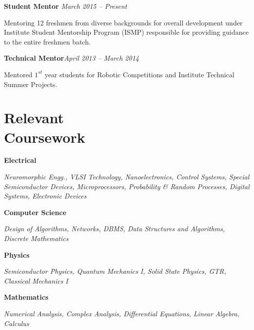 \documentclass[margin,line]{res}
\newenvironment{list1}{
  \begin{list}{\ding{113}}{%
      \setlength{\itemsep}{0in}
      \setlength{\parsep}{0in} \setlength{\parskip}{0in}
      \setlength{\topsep}{0in} \setlength{\partopsep}{0in} 
      \setlength{\leftmargin}{0.17in}}}{\end{list}}
\begin{document}
\begin{resume}
\vspace*{-0.1in}

\textbf{Student Mentor} \hfill \textit{March 2015 -- Present}\\
\vspace*{-.15in}
\begin{list1}
\item[]Mentoring 12 freshmen from diverse backgrounds for overall development under Institute Student Mentorship Program (ISMP) responsible for providing guidance to the entire freshmen batch. 
\end{list1}

\vspace*{-0.1in}

\textbf{Technical Mentor}\hfill \textit{April 2013 -- March 2014}\\
\vspace*{-.15in}
\begin{list1}
\item[]Mentored $1^{st}$ year students for Robotic Competitions and Institute Technical Summer Projects.
\end{list1}

\section{\sc Relevant \\Coursework} 
\begin{list1}
\item[\strut\hspace{0.5cm}\hypertarget{crselst}{\textbf{Electrical}}]
\item[]\textit{Neuromorphic Engg., VLSI Technology, Nanoelectronics, Control Systems, Special Semiconductor Devices, Microprocessors, Probability \& Random Processes, Digital Systems, Electronic Devices}
\item[\strut\hspace{0.5cm}\textbf{Computer Science}]
\vspace{0.05in}
\item[]\textit{Design of Algorithms, Networks, DBMS, Data Structures and Algorithms, Discrete Mathematics}
\item[\strut\hspace{0.5cm}\textbf{Physics}]
\vspace{0.05in}
\item[]\textit{Semiconductor Physics, Quantum Mechanics I, Solid State Physics, GTR, Classical Mechanics I}
\item[\strut\hspace{0.5cm}\textbf{Mathematics}]
\vspace{0.05in}
\item[]\textit{Numerical Analysis, Complex Analysis, Differential Equations, Linear Algebra, Calculus}
\end{list1}


\end{resume}
\end{document}
